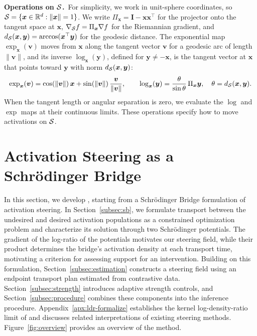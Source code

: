 \noindent\textbf{Operations on $\mathcal{S}$.}~For simplicity, we work in unit-sphere coordinates, so $\mathcal{S}=\{\boldsymbol{x}\in\mathbb{R}^{d}:\lVert\boldsymbol{x}\rVert=1\}$. We write $\Pi_{\boldsymbol{x}}=\boldsymbol{I}-\boldsymbol{x}\boldsymbol{x}^{\top}$ for the projector onto the tangent space at $\boldsymbol{x}$, $\nabla_{\mathcal{S}} f=\Pi_{\boldsymbol{x}}\nabla f$ for the Riemannian gradient, and $d_{\mathcal{S}}(\boldsymbol{x},\boldsymbol{y})=\arccos(\boldsymbol{x}^{\top}\boldsymbol{y})$ for the geodesic distance. The exponential map $\exp_{\boldsymbol{x}}(\boldsymbol{v})$ moves from $\boldsymbol{x}$ along the tangent vector $\boldsymbol{v}$ for a geodesic arc of length $\lVert\boldsymbol{v}\rVert$, and its inverse $\log_{\boldsymbol{x}}(\boldsymbol{y})$, defined for $\boldsymbol{y}\neq-\boldsymbol{x}$, is the tangent vector at $\boldsymbol{x}$ that points toward $\boldsymbol{y}$ with norm $d_{\mathcal{S}}(\boldsymbol{x},\boldsymbol{y})$:
\begin{equation}
\exp_{\boldsymbol{x}}(\boldsymbol{v})
= \cos\!\left(\lVert\boldsymbol{v}\rVert\right)\boldsymbol{x}
+ \sin\!\left(\lVert\boldsymbol{v}\rVert\right)\frac{\boldsymbol{v}}{\lVert\boldsymbol{v}\rVert},
\qquad
\log_{\boldsymbol{x}}(\boldsymbol{y}) = \frac{\theta}{\sin\theta}\,\Pi_{\boldsymbol{x}}\boldsymbol{y},
\quad \theta = d_{\mathcal{S}}(\boldsymbol{x},\boldsymbol{y}).
\label{eq:expmap}
\end{equation}
When the tangent length or angular separation is zero, we evaluate the $\log$ and $\exp$ maps at their continuous limits. These operations specify how to move activations on $\mathcal{S}$. %

\section{Activation Steering as a Schr\"{o}dinger Bridge}
\label{sec:method}
In this section, we develop \Cobras, starting from a Schr\"{o}dinger Bridge formulation of activation steering. In Section~\ref{subsec:sb}, we formulate transport between the undesired and desired activation populations as a constrained optimization problem and characterize its solution through two Schr\"{o}dinger potentials. The gradient of the log-ratio of the potentials motivates our steering field, while their product determines the bridge's activation density at each transport time, motivating a criterion for assessing support for an intervention. Building on this formulation, Section~\ref{subsec:estimation} constructs a steering field using an endpoint transport plan estimated from contrastive data. Section~\ref{subsec:strength} introduces adaptive strength controls, and Section~\ref{subsec:procedure} combines these components into the inference procedure. Appendix~\ref{apx:ldr-formalize} establishes the kernel log-density-ratio limit of \Cobras and discusses related interpretations of existing steering methods. Figure~\ref{fig:overview} provides an overview of the method.



